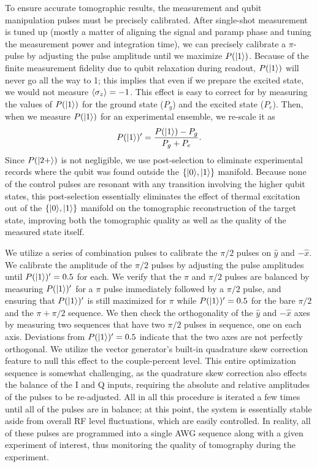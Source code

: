 To ensure accurate tomographic results, the measurement and qubit manipulation pulses must be precisely calibrated.  After single-shot measurement is tuned up (mostly a matter of aligning the signal and paramp phase and tuning the measurement power and integration time), we can precisely calibrate a $\pi$-pulse by adjusting the pulse amplitude until we maximize $P(|1\rangle)$.  Because of the finite measurement fidelity due to qubit relaxation during readout, $P(|1\rangle)$ will never go all the way to 1; this implies that even if we prepare the excited state, we would not measure $\langle\sigma_z\rangle = -1$.  This effect is easy to correct for by measuring the values of $P(|1\rangle)$ for the ground state ($P_g$) and the excited state ($P_e$).  Then, when we measure $P(|1\rangle)$ for an experimental ensemble, we re-scale it as 
\begin{equation}
P(|1\rangle)' = \frac{P(|1\rangle) - P_g}{P_g + P_e}.
\end{equation}
Since $P(|2+\rangle)$ is not negligible, we use post-selection to eliminate experimental records where the qubit was found outside the $\{ |0\rangle,|1\rangle \}$ manifold.  Because none of the control pulses are resonant with any transition involving the higher qubit states, this post-selection essentially eliminates the effect of thermal excitation out of the $\{ |0\rangle,|1\rangle \}$ manifold on the tomographic reconstruction of the target state, improving both the tomographic quality as well as the quality of the measured state itself.

We utilize a series of combination pulses to calibrate the $\pi/2$ pulses on $\hat{y}$ and $-\hat{x}$.  We calibrate the amplitude of the $\pi/2$ pulses by adjusting the pulse amplitudes until $P(|1\rangle)' = 0.5$ for each.  We verify that the $\pi$ and $\pi/2$ pulses are balanced by measuring $P(|1\rangle)'$ for a $\pi$ pulse immediately followed by a $\pi/2$ pulse, and ensuring that $P(|1\rangle)'$ is still maximized for $\pi$ while $P(|1\rangle)' = 0.5$ for the bare $\pi/2$ and the $\pi + \pi/2$ sequence.  We then check the orthogonality of the $\hat{y}$ and $-\hat{x}$ axes by measuring two sequences that have two $\pi/2$ pulses in sequence, one on each axis.  Deviations from $P(|1\rangle)' = 0.5$ indicate that the two axes are not perfectly orthogonal.  We utilize the vector generator's built-in quadrature skew correction feature to null this effect to the couple-percent level.  This entire optimization sequence is somewhat challenging, as the quadrature skew correction also effects the balance of the I and Q inputs, requiring the absolute and relative amplitudes of the pulses to be re-adjusted.  All in all this procedure is iterated a few times until all of the pulses are in balance; at this point, the system is essentially stable aside from overall RF level fluctuations, which are easily controlled.  In reality, all of these pulses are programmed into a single AWG sequence along with a given experiment of interest, thus monitoring the quality of tomography during the experiment.

